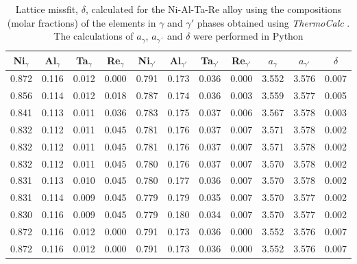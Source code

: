 \begin{table}[H]
    \centering
    \begin{tabular}{rrrrrrrrrrr}
        \multicolumn{1}{c}{Ni$_\gamma$} & \multicolumn{1}{c}{Al$_\gamma$} & \multicolumn{1}{c}{Ta$_\gamma$} & \multicolumn{1}{c}{Re$_\gamma$} & \multicolumn{1}{c}{Ni$_{\gamma'}$} & \multicolumn{1}{c}{Al$_{\gamma'}$} & \multicolumn{1}{c}{Ta$_{\gamma'}$} & \multicolumn{1}{c}{Re$_{\gamma'}$} & \multicolumn{1}{c}{$a_\gamma$} & \multicolumn{1}{c}{$a_{\gamma'}$} & \multicolumn{1}{c}{$\delta$} \\ \hline \hline
        0.872 & 0.116 & 0.012 & 0.000 & 0.791 & 0.173 & 0.036 & 0.000 & 3.552 & 3.576 & 0.007 \\0.856 & 0.114 & 0.012 & 0.018 & 0.787 & 0.174 & 0.036 & 0.003 & 3.559 & 3.577 & 0.005 \\0.841 & 0.113 & 0.011 & 0.036 & 0.783 & 0.175 & 0.037 & 0.006 & 3.567 & 3.578 & 0.003 \\0.832 & 0.112 & 0.011 & 0.045 & 0.781 & 0.176 & 0.037 & 0.007 & 3.571 & 3.578 & 0.002 \\0.832 & 0.112 & 0.011 & 0.045 & 0.781 & 0.176 & 0.037 & 0.007 & 3.571 & 3.578 & 0.002 \\0.832 & 0.112 & 0.011 & 0.045 & 0.780 & 0.176 & 0.037 & 0.007 & 3.570 & 3.578 & 0.002 \\0.831 & 0.113 & 0.010 & 0.045 & 0.780 & 0.177 & 0.036 & 0.007 & 3.570 & 3.578 & 0.002 \\0.831 & 0.114 & 0.009 & 0.045 & 0.779 & 0.179 & 0.035 & 0.007 & 3.570 & 3.577 & 0.002 \\0.830 & 0.116 & 0.009 & 0.045 & 0.779 & 0.180 & 0.034 & 0.007 & 3.570 & 3.577 & 0.002 \\0.872 & 0.116 & 0.012 & 0.000 & 0.791 & 0.173 & 0.036 & 0.000 & 3.552 & 3.576 & 0.007 \\0.872 & 0.116 & 0.012 & 0.000 & 0.791 & 0.173 & 0.036 & 0.000 & 3.552 & 3.576 & 0.007
    \end{tabular}
    \caption{Lattice missfit, $\delta$, calculated for the Ni-Al-Ta-Re alloy using the compositions (molar fractions) of the elements in $\gamma$ and $\gamma'$ phases obtained using \textit{ThermoCalc} \citep{thermocalc}. The calculations of $a_\gamma$, $a_{\gamma´}$ and $\delta$ were performed in Python \citep{mygit}}
    \label{tab:tab10}
\end{table}


